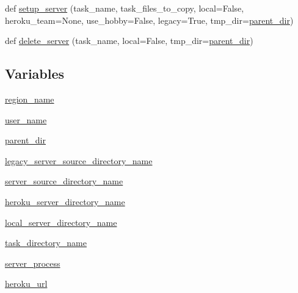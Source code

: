 \begin{DoxyCompactItemize}
\item 
def \hyperlink{namespaceparlai_1_1mturk_1_1core_1_1server__utils_a154e8cbb18375ff8fd6730154d312bbc}{setup\+\_\+server} (task\+\_\+name, task\+\_\+files\+\_\+to\+\_\+copy, local=False, heroku\+\_\+team=None, use\+\_\+hobby=False, legacy=True, tmp\+\_\+dir=\hyperlink{namespaceparlai_1_1mturk_1_1core_1_1server__utils_a193439bdbc25a32b00f1a43e6f8532d8}{parent\+\_\+dir})
\item 
def \hyperlink{namespaceparlai_1_1mturk_1_1core_1_1server__utils_a3c7c1d82bd4d26eb98ce9711de3cca7c}{delete\+\_\+server} (task\+\_\+name, local=False, tmp\+\_\+dir=\hyperlink{namespaceparlai_1_1mturk_1_1core_1_1server__utils_a193439bdbc25a32b00f1a43e6f8532d8}{parent\+\_\+dir})
\end{DoxyCompactItemize}
\subsection*{Variables}
\begin{DoxyCompactItemize}
\item 
\hyperlink{namespaceparlai_1_1mturk_1_1core_1_1server__utils_a677cf88f4f2a1e0bc2c93c5d40c2e49d}{region\+\_\+name}
\item 
\hyperlink{namespaceparlai_1_1mturk_1_1core_1_1server__utils_aab8bab9c0a550608566b493173c8fd28}{user\+\_\+name}
\item 
\hyperlink{namespaceparlai_1_1mturk_1_1core_1_1server__utils_a193439bdbc25a32b00f1a43e6f8532d8}{parent\+\_\+dir}
\item 
\hyperlink{namespaceparlai_1_1mturk_1_1core_1_1server__utils_a02e8688330df26d098d2c719583fb10c}{legacy\+\_\+server\+\_\+source\+\_\+directory\+\_\+name}
\item 
\hyperlink{namespaceparlai_1_1mturk_1_1core_1_1server__utils_a6abce559cbe7e80bc5bbf32cc1fcff5a}{server\+\_\+source\+\_\+directory\+\_\+name}
\item 
\hyperlink{namespaceparlai_1_1mturk_1_1core_1_1server__utils_ab10051dadca0c79ca62cc3974302b38c}{heroku\+\_\+server\+\_\+directory\+\_\+name}
\item 
\hyperlink{namespaceparlai_1_1mturk_1_1core_1_1server__utils_ab9e3011a4cf2f86f4d520249eed8c77d}{local\+\_\+server\+\_\+directory\+\_\+name}
\item 
\hyperlink{namespaceparlai_1_1mturk_1_1core_1_1server__utils_ae9c1d985b98f823a2a479d519af0c06d}{task\+\_\+directory\+\_\+name}
\item 
\hyperlink{namespaceparlai_1_1mturk_1_1core_1_1server__utils_a78acb12c579488b178c9815ce79f4018}{server\+\_\+process}
\item 
\hyperlink{namespaceparlai_1_1mturk_1_1core_1_1server__utils_af0a7a24b863dfa547099d64e3bc498a6}{heroku\+\_\+url}
\end{DoxyCompactItemize}


